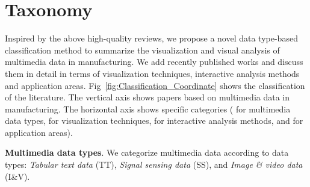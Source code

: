 \documentclass[a4paper,fleqn]{cas-dc}
\begin{document}
\section{Taxonomy}
Inspired by the above high-quality reviews, we propose a novel data type-based classification method to summarize the visualization and visual analysis of multimedia data in manufacturing. 
We add recently published works and discuss them in detail in terms of visualization techniques, interactive analysis methods and application areas.
Fig~\ref{fig:Classification_Coordinate} shows the classification of the literature. The vertical axis shows papers based on multimedia data in manufacturing. The horizontal axis shows specific categories (
 for multimedia data types, 
 for visualization techniques, 
 for interactive analysis methods, and 
 for application areas).

 \textbf{Multimedia data types}. 
We categorize multimedia data according to data types: \textit{Tabular text data} (TT), \textit{Signal sensing data} (SS), and \textit{Image \& video data} (I\&V). 
\end{document}
